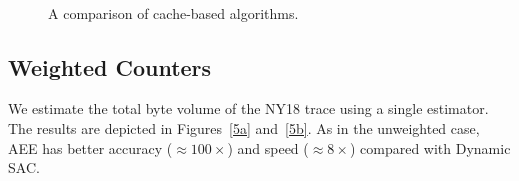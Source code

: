 
\begin{figure}[t]
    \centering
\\  
    \caption{A comparison of cache-based algorithms. 
    \label{fig:cache-based}}\vspace*{-3mm}
\end{figure} 
\subsection{Weighted Counters}
We estimate the total byte volume of the NY18 trace using a single estimator. %
The results are depicted in Figures~\ref{5a} and~\ref{5b}. As in the unweighted case, AEE has better accuracy (${\approx}100\times$) and speed (${\approx}8\times$) compared with Dynamic SAC. 

